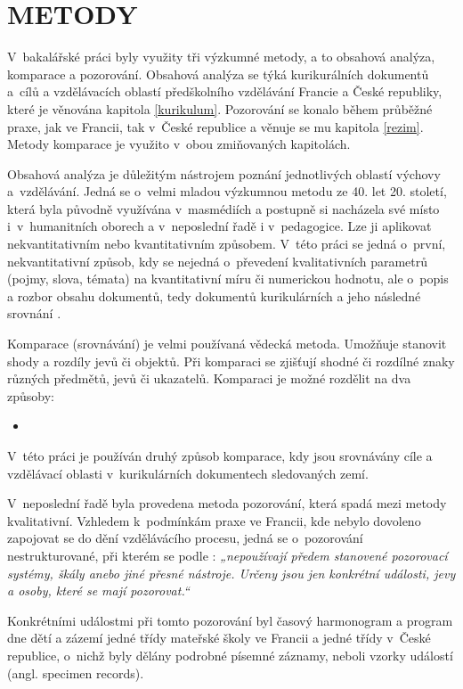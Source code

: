 
\chapter{METODY}
\label{metody}

V~bakalářské práci byly využity tři výzkumné metody, a to obsahová analýza, komparace a pozorování. Obsahová analýza se týká kurikurálních dokumentů a cílů a vzdělávacích oblastí předškolního vzdělávání Francie a České republiky, které je věnována kapitola \ref{kurikulum}. Pozorování se konalo během průběžné praxe, jak ve Francii, tak v České republice a věnuje se mu kapitola \ref{rezim}. Metody komparace je využito v~obou zmiňovaných kapitolách. 

Obsahová analýza je důležitým nástrojem poznání jednotlivých oblastí výchovy a vzdělávání. Jedná se o~velmi mladou výzkumnou metodu ze 40. let 20. století, která byla původně využívána v masmédiích a postupně si nacházela své místo i v humanitních oborech a v neposlední řadě i v pedagogice. Lze ji aplikovat nekvantitativním nebo kvantitativním způsobem. V této práci se jedná o~první, nekvantitativní způsob, kdy se nejedná o~převedení kvalitativních parametrů (pojmy, slova, témata) na kvantitativní míru či numerickou hodnotu, ale o~popis a rozbor obsahu dokumentů, tedy dokumentů kurikulárních a jeho následné srovnání \citep{Gavora08}.

Komparace (srovnávání) je velmi používaná vědecká metoda. Umožňuje stanovit shody a rozdíly jevů či objektů. Při komparaci se zjišťují shodné či rozdílné znaky různých předmětů, jevů či ukazatelů. 
Komparaci je možné rozdělit na dva způsoby: \citep[s.~19]{Siroky}
\begin{itemize}
\item [] 
\end{itemize}
V~této práci je používán druhý způsob komparace, kdy jsou srovnávány cíle a vzdělávací oblasti v~kurikulárních dokumentech sledovaných zemí.  

V~neposlední řadě byla provedena metoda pozorování, která spadá mezi metody kvalitativní. Vzhledem k podmínkám praxe ve Francii, kde nebylo dovoleno zapojovat se do dění vzdělávácího procesu, jedná se o~pozorování nestrukturované, při kterém se podle \citet[s.~17]{Gavora96}: \textit{„nepoužívají předem stanovené pozorovací systémy, škály anebo jiné přesné nástroje. Určeny jsou jen konkrétní události, jevy a osoby, které se mají pozorovat.“} 

Konkrétními událostmi při tomto pozorování byl časový harmonogram a program dne dětí a zázemí jedné třídy mateřské školy ve Francii a jedné třídy v České republice, o~nichž byly dělány podrobné písemné záznamy, neboli vzorky událostí (angl. specimen records). 

